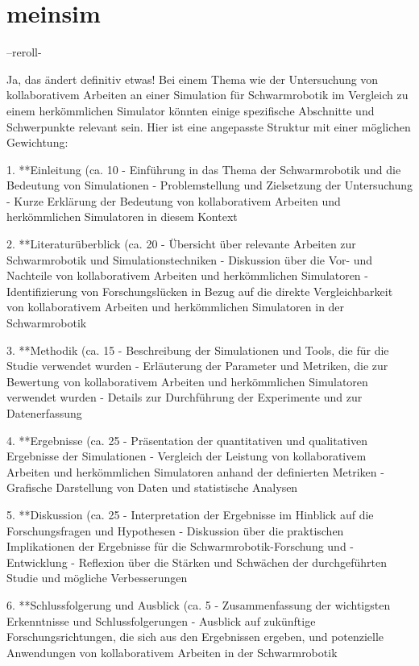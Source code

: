 \documentclass[german,version-2020-11]{uzl-thesis}
\begin{document}
\chapter{meinsim}%
\label{chapter-use}



   
   --reroll-
   
   Ja, das ändert definitiv etwas! Bei einem Thema wie der Untersuchung von kollaborativem Arbeiten an einer Simulation 
   für Schwarmrobotik im Vergleich zu einem herkömmlichen Simulator könnten einige spezifische Abschnitte und Schwerpunkte 
   relevant sein. Hier ist eine angepasste Struktur mit einer möglichen Gewichtung:

1. **Einleitung (ca. 10%
   - Einführung in das Thema der Schwarmrobotik und die Bedeutung von Simulationen
   - Problemstellung und Zielsetzung der Untersuchung
   - Kurze Erklärung der Bedeutung von kollaborativem Arbeiten und herkömmlichen Simulatoren in diesem Kontext

2. **Literaturüberblick (ca. 20%
   - Übersicht über relevante Arbeiten zur Schwarmrobotik und Simulationstechniken
   - Diskussion über die Vor- und Nachteile von kollaborativem Arbeiten und herkömmlichen Simulatoren
   - Identifizierung von Forschungslücken in Bezug auf die direkte Vergleichbarkeit von kollaborativem Arbeiten und herkömmlichen Simulatoren in der Schwarmrobotik

3. **Methodik (ca. 15%
   - Beschreibung der Simulationen und Tools, die für die Studie verwendet wurden
   - Erläuterung der Parameter und Metriken, die zur Bewertung von kollaborativem Arbeiten und herkömmlichen Simulatoren verwendet wurden
   - Details zur Durchführung der Experimente und zur Datenerfassung

4. **Ergebnisse (ca. 25%
   - Präsentation der quantitativen und qualitativen Ergebnisse der Simulationen
   - Vergleich der Leistung von kollaborativem Arbeiten und herkömmlichen Simulatoren anhand der definierten Metriken
   - Grafische Darstellung von Daten und statistische Analysen

5. **Diskussion (ca. 25%
   - Interpretation der Ergebnisse im Hinblick auf die Forschungsfragen und Hypothesen
   - Diskussion über die praktischen Implikationen der Ergebnisse für die Schwarmrobotik-Forschung und -Entwicklung
   - Reflexion über die Stärken und Schwächen der durchgeführten Studie und mögliche Verbesserungen

6. **Schlussfolgerung und Ausblick (ca. 5%
   - Zusammenfassung der wichtigsten Erkenntnisse und Schlussfolgerungen
   - Ausblick auf zukünftige Forschungsrichtungen, die sich aus den Ergebnissen ergeben, und potenzielle Anwendungen von kollaborativem Arbeiten in der Schwarmrobotik
\end{document}
